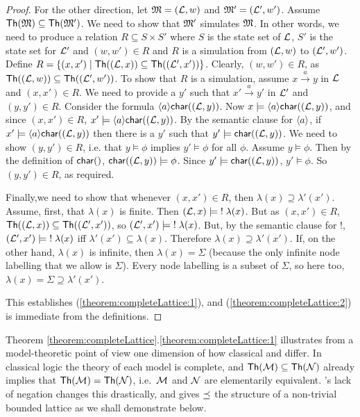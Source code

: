 \begin{proof}
For the other direction, let $\frak{M} = (\mathcal{L}, w)$ and $\frak{M}' = (\mathcal{L}',
w')$.  Assume $\mathsf{Th}(\frak{M}) \subseteq \mathsf{Th}(\frak{M}') $. We need to
show that $\frak{M}'$ simulates $\frak{M}$.  In other words, we need to
produce a relation $R \subseteq S \times S'$ where $S$ is the state
set of $\mathcal{L}$, $S'$ is the state set for $\mathcal{L}'$ and $(w,w') \in R$
and $R$ is a simulation from $(\mathcal{L}, w)$ to $ (\mathcal{L}', w')$.  Define $R
= \{(x,x') \; | \; \mathsf{Th}( (\mathcal{L}, x)) \subseteq \mathsf{Th}( (\mathcal{L}',
  x'))\}$.  Clearly, $(w,w') \in R$, as $\mathsf{Th}((\mathcal{L}, w)) \subseteq
\mathsf{Th}((\mathcal{L}', w')) $.  To show that $R$ is a simulation, assume $x
\xrightarrow{a} y$ in $\mathcal{L}$ and $(x,x') \in R$. 
We need to provide a
$y'$ such that $x' \xrightarrow{a} y'$ in $\mathcal{L}'$ and $(y,y') \in R$.  
Consider the formula $\langle a \rangle \mathsf{char}((\mathcal{L}, y))$. 
Now $x \models \langle a \rangle \mathsf{char}((\mathcal{L}, y))$, and since $(x,x') \in R$, $x' \models \langle a \rangle \mathsf{char}((\mathcal{L}, y))$.
By the semantic clause for $\MAY{a}$, if $x' \models \langle a \rangle \mathsf{char}((\mathcal{L}, y))$ then there is a $y'$ such that 
$y' \models \mathsf{char}((\mathcal{L}, y))$.
We need to show $(y,y') \in R$, i.e. that $y \models \phi$ implies $y' \models \phi$ for all $\phi$.
Assume $y \models \phi$. 
Then by the definition of $\CHAR$, $\mathsf{char}((\mathcal{L}, y)) \models \phi$.
Since $y' \models \mathsf{char}((\mathcal{L}, y))$, $y' \models \phi$. 
So $(y,y') \in R$, as required.

Finally,we need to show that whenever $(x,x') \in R$, then $\lambda(x)
\supseteq \lambda'(x')$.  Assume, first, that $\lambda(x)$ is finite.
Then $(\mathcal{L}, x) \models \; ! \; \lambda(x)$.  But as $(x,x') \in R$,
$\mathsf{Th}((\mathcal{L}, x)) \subseteq \mathsf{Th}((\mathcal{L}', x')) $, so $(\mathcal{L}', x')
\models \; ! \; \lambda(x)$.  But, by the semantic clause for $!$,
$(\mathcal{L}', x') \models \; ! \; \lambda(x)$ iff $\lambda'(x') \subseteq
\lambda(x)$.  Therefore $\lambda(x) \supseteq \lambda'(x')$.  If, on
the other hand, $\lambda(x)$ is infinite, then $\lambda(x) = \Sigma$
(because the only infinite node labelling that we allow is
$\Sigma$). Every node labelling is a subset of $\Sigma$, so here too,
$\lambda(x) = \Sigma \supseteq \lambda'(x')$.  

This establishes (\ref{theorem:completeLattice:1}), and
(\ref{theorem:completeLattice:2}) is immediate from the definitions.


\end{proof}

\NI Theorem
\ref{theorem:completeLattice}.\ref{theorem:completeLattice:1}
illustrates from a model-theoretic point of view one dimension of how
classical and \cathoristic{} differ. In classical logic the theory of
each model is complete, and $\mathsf{Th}(\mathcal{M}) \subseteq
\mathsf{Th}(\mathcal{N})$ already implies that $\mathsf{Th}(\mathcal{M}) =
\mathsf{Th}(\mathcal{N})$, i.e.~$\mathcal{M}$ and $\mathcal{N}$ are elementarily
equivalent. \Cathoristic{}'s lack of negation changes this drastically, and
gives $\preceq$ the structure of a non-trivial bounded lattice as we
shall demonstrate below.

